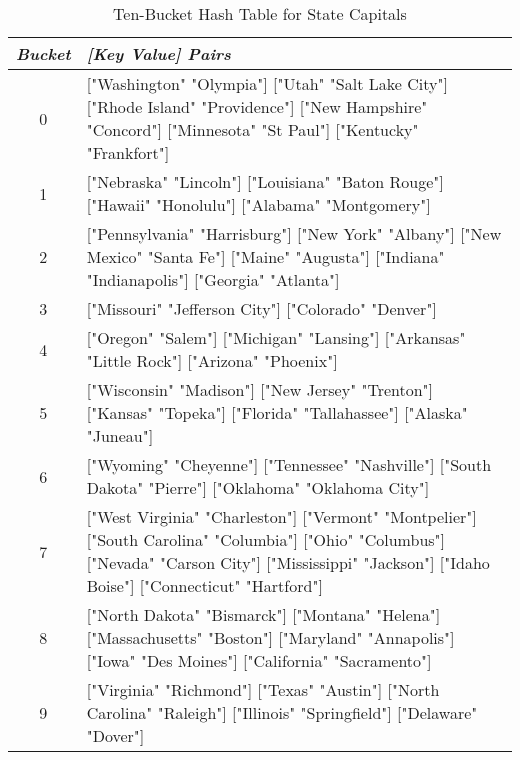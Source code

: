 \begin{table}
\begin{center}
\begin{tabular}{c|p{4in}}
\emph{Bucket} & \emph{[Key Value] Pairs} \\
\hline
0 & \textsf{["Washington" "Olympia"]  ["Utah"  "Salt Lake City"]}  \hfill\break
\textsf{["Rhode Island"  "Providence"]  ["New Hampshire"  "Concord"]}  \hfill\break
\textsf{["Minnesota"  "St Paul"]  ["Kentucky"  "Frankfort"]} \\
\hline
1 & \textsf{["Nebraska"  "Lincoln"] ["Louisiana"  "Baton Rouge"]} \hfill\break
\textsf{["Hawaii"  "Honolulu"]  ["Alabama"  "Montgomery"]} \\
\hline
2 & \textsf{["Pennsylvania"  "Harrisburg"]  ["New York" "Albany"]} \hfill\break
\textsf{["New Mexico"  "Santa Fe"]  ["Maine"  "Augusta"]} \hfill\break
\textsf{["Indiana"  "Indianapolis"]  ["Georgia"  "Atlanta"]} \\
\hline
3 & \textsf{["Missouri"  "Jefferson City"]  ["Colorado"  "Denver"]} \\
\hline
4 & \textsf{["Oregon"  "Salem"]  ["Michigan"  "Lansing"]} \hfill\break
\textsf{["Arkansas"  "Little Rock"]  ["Arizona"  "Phoenix"]} \\
\hline
5 & \textsf{["Wisconsin" "Madison"]  ["New Jersey"  "Trenton"]} \hfill\break
\textsf{["Kansas"  "Topeka"]  ["Florida"  "Tallahassee"]} \hfill\break
\textsf{["Alaska"  "Juneau"]} \\
\hline
6 & \textsf{["Wyoming"  "Cheyenne"]  ["Tennessee"  "Nashville"]} \hfill\break
\textsf{["South Dakota"  "Pierre"]  ["Oklahoma"  "Oklahoma City"]} \\
\hline
7 & \textsf{["West Virginia"  "Charleston"]  ["Vermont"  "Montpelier"]} \hfill\break
\textsf{["South Carolina"  "Columbia"]  ["Ohio"  "Columbus"]} \hfill\break
\textsf{["Nevada"  "Carson City"]  ["Mississippi"  "Jackson"]} \hfill\break
\textsf{["Idaho  Boise"]  ["Connecticut"  "Hartford"]} \\
\hline
8 & \textsf{["North Dakota"  "Bismarck"]  ["Montana"  "Helena"]} \hfill\break
\textsf{["Massachusetts"  "Boston"]  ["Maryland"  "Annapolis"]} \hfill\break
\textsf{["Iowa" "Des Moines"]  ["California"  "Sacramento"]} \\
\hline
9 & \textsf{["Virginia"  "Richmond"]  ["Texas" "Austin"]} \hfill\break
\textsf{["North Carolina" "Raleigh"]  ["Illinois"  "Springfield"]} \hfill\break
\textsf{["Delaware"  "Dover"]} \\
\end{tabular}
\end{center}
\caption{Ten-Bucket Hash Table for State Capitals}
\label{table:hash-table-state-capitals}
\end{table}

